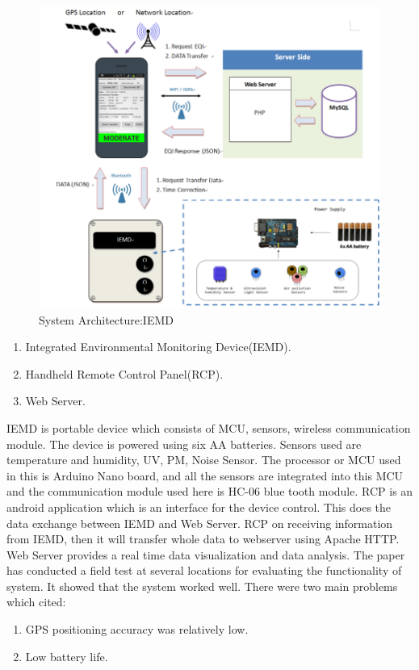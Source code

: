 \documentclass[10pt,a4paper]{report}
\begin{document}
\begin{figure}[h!]
  \centering
  \hspace*{-1.25cm}   
\includegraphics[scale=0.34]{images/fig1.png}
  \hspace*{-1.25cm}
  \caption{System Architecture:IEMD}
  \label{arch}
\end{figure}


\begin{enumerate}
\item	Integrated Environmental Monitoring Device(IEMD).
\item	Handheld Remote Control Panel(RCP).
\item	Web Server.
\end{enumerate}

 
IEMD is portable device which consists of MCU, sensors, wireless communication module. The device is powered using six AA batteries. Sensors used are temperature and humidity, UV, PM, Noise Sensor.
The processor or MCU used in this is Arduino Nano board, and all the sensors are integrated into this MCU and the communication module used here is HC-06 blue tooth module.
RCP is an android application which is an interface for the device control. This does the data exchange between IEMD and Web Server. RCP on receiving information from IEMD, then it will transfer whole data to webserver using Apache HTTP.
Web Server provides a real time data visualization and data analysis. The paper has conducted a field test at several locations for evaluating the functionality of system. It showed that the system worked well. There were two main problems which cited:
\begin{enumerate}
\item GPS positioning accuracy was relatively low.
\item Low battery life.

\end{enumerate}
\end{document}
